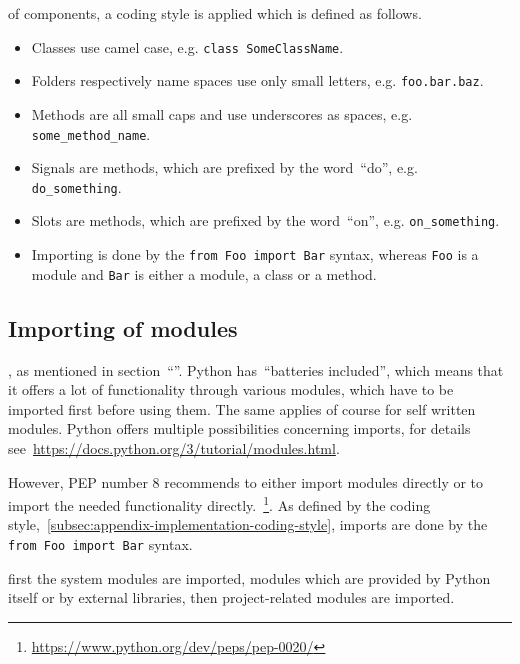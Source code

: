 \documentclass[%
    a4paper,    %
    justified,  %
    nobib,      %
    openany     %
]{tufte-book}
\begin{document}
 of components, a
coding style is applied which is defined as follows.

\begin{itemize}
  \item Classes use camel case, e.g. \verb+class SomeClassName+.
  \item Folders respectively name spaces use only small letters, e.g.
    \verb+foo.bar.baz+.
  \item Methods are all small caps and use underscores as spaces, e.g.
    \verb+some_method_name+.
  \item Signals are methods, which are prefixed by the word~\enquote{do}, e.g.
    \verb+do_something+.
  \item Slots are methods, which are prefixed by the word~\enquote{on}, e.g.
    \verb+on_something+.
  \item Importing is done by the \verb+from Foo import Bar+ syntax, whereas
    \verb+Foo+ is a module and \verb+Bar+ is either a module, a class or a
    method.
\end{itemize}

\subsection{Importing of modules}
\label{appendix:subsec:imports}

, as mentioned
in section~\enquote{}.
Python has~\enquote{batteries included}, which means that it offers a lot of
functionality through various modules, which have to be imported first before
using them. The same applies of course for self written modules. Python offers
multiple possibilities concerning imports, for details
see~\url{https://docs.python.org/3/tutorial/modules.html}. 

However, PEP number 8 recommends to either import modules directly or to import
the needed functionality
directly.~\footnote{\url{https://www.python.org/dev/peps/pep-0020/}}. As defined
by the coding style,~\autoref{subsec:appendix-implementation-coding-style},
imports are done by the \verb+from Foo import Bar+ syntax.

 first the system modules
are imported, modules which are provided by Python itself or by external
libraries, then project-related modules are imported.
\end{document}

